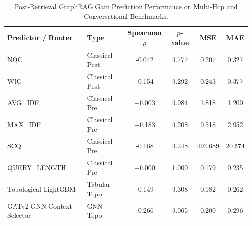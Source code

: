 \begin{table}[t]
\centering
\small
\caption{Post-Retrieval GraphRAG Gain Prediction Performance on Multi-Hop and Conversational Benchmarks.}
\label{tab:qpp_correlations}
\begin{tabular}{llcccc}
\toprule
\textbf{Predictor / Router} & \textbf{Type} & \textbf{Spearman $\rho$} & \textbf{$p$-value} & \textbf{MSE} & \textbf{MAE} \\
\midrule
NQC & Classical Post & -0.042 & 0.777 & 0.207 & 0.327 \\
WIG & Classical Post & -0.154 & 0.292 & 0.243 & 0.377 \\
AVG_IDF & Classical Pre & +0.003 & 0.984 & 1.818 & 1.200 \\
MAX_IDF & Classical Pre & +0.183 & 0.208 & 9.518 & 2.952 \\
SCQ & Classical Pre & -0.168 & 0.248 & 492.689 & 20.574 \\
QUERY_LENGTH & Classical Pre & +0.000 & 1.000 & 0.179 & 0.235 \\
Topological LightGBM & Tabular Topo & -0.149 & 0.308 & 0.182 & 0.262 \\
GATv2 GNN Context Selector & GNN Topo & -0.266 & 0.065 & 0.200 & 0.296 \\
\bottomrule
\end{tabular}
\end{table}